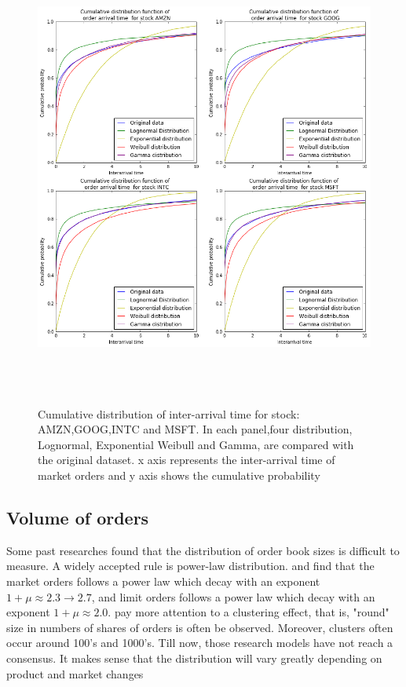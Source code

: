 \begin{figure}[hbtp]
  \begin{center}
    \includegraphics[width=6in,height=6in]{figures/arrival_time.png}
  \end{center}
\caption{Cumulative distribution of inter-arrival time for stock: AMZN,GOOG,INTC and MSFT. In each panel,four distribution, Lognormal, Exponential Weibull and Gamma, are compared with the original dataset. x axis represents the inter-arrival time of market orders and y axis shows the cumulative probability } \label{fig:arrival}
\end{figure}


\subsection{Volume of orders}
Some past researches found that the distribution of order book sizes is difficult to measure. A widely accepted rule is power-law distribution.\cite{gopikrishnan2000statistical} and \cite{maslov2001price} find that the market orders follows a power law which decay with an exponent $1+\mu\approx2.3 \rightarrow 2.7$, and limit orders follows a power law which decay with an exponent $1+\mu \approx 2.0$. \cite{challet2001analyzing} pay more attention to a clustering effect, that is, "round" size in numbers of shares of orders is often be observed. Moreover, clusters often occur around 100's and 1000's. Till now, those research models have not reach a consensus. It makes sense that the distribution will vary greatly depending on product and market changes


